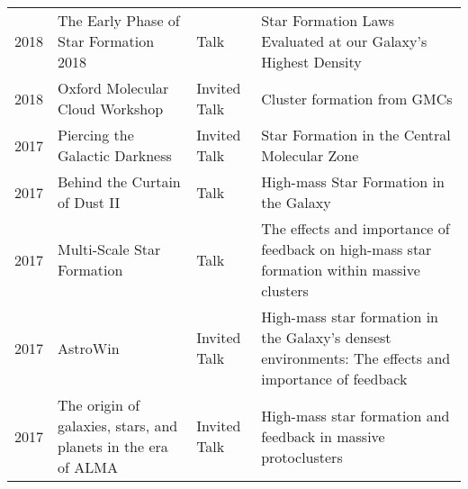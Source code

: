 \begin{tabular}{cp{1.8in}p{1.5cm}p{3.0in}}
    2018 &      The Early Phase of Star Formation 2018 & Talk & Star Formation Laws Evaluated at our Galaxy's Highest Density \\
    2018 &      Oxford Molecular Cloud Workshop & Invited Talk & Cluster formation from GMCs \\
    2017 &      Piercing the Galactic Darkness & Invited Talk & Star Formation in the Central Molecular Zone \\
    2017 &      Behind the Curtain of Dust II & Talk & High-mass Star Formation in the Galaxy \\
    2017 &      Multi-Scale Star Formation & Talk & The effects and importance of feedback on high-mass star formation within massive clusters \\
    2017 &      AstroWin & Invited Talk & High-mass star formation in the Galaxy's densest environments: The effects and importance of feedback\\
    2017 &      The origin of galaxies, stars, and planets in the era of ALMA & Invited Talk & High-mass star formation and feedback in massive protoclusters \\

\end{tabular}
